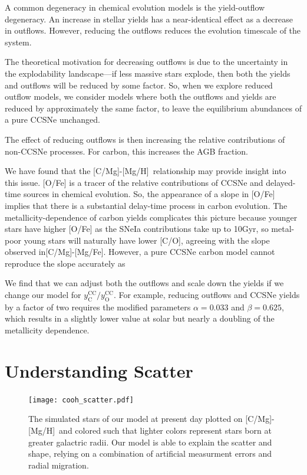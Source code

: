 \documentclass[12pt,oneside]{report}
\newcommand{\caah}{[C/Mg]-[Mg/H]}
\newcommand{\caafe}{[C/Mg]-[Mg/Fe]}
\begin{document}
A common degeneracy in chemical evolution models is the yield-outflow degeneracy. An increase in stellar yields has a near-identical effect as a decrease in outflows. However, reducing the outflows reduces the evolution timescale of the system. 

The theoretical motivation for decreasing outflows is due to the uncertainty in the explodability landscape---if less massive stars explode, then both the yields and outflows will be reduced by some factor. So, when we explore reduced outflow models, we consider models where both the outflows and yields are reduced by approximately the same factor, to leave the equilibrium abundances of a pure CCSNe unchanged. 

The effect of reducing outflows is then increasing the relative contributions of non-CCSNe processes. For carbon, this increases the AGB fraction.

We have found that the \caah~relationship may provide insight into this issue. [O/Fe] is a tracer of the relative contributions of CCSNe and delayed-time sources in chemical evolution. So, the appearance of a slope in [O/Fe] implies that there is a substantial delay-time process in carbon evolution. 
The metallicity-dependence of carbon yields complicates this picture because
younger stars have higher [O/Fe] as the SNeIa contributions take up to 10Gyr,
so metal-poor young stars will naturally have lower [C/O], agreeing with the
slope observed in\caafe. However, a pure CCSNe carbon model cannot reproduce the slope accurately as  


We find that we can adjust both the outflows and scale down the yields if we change our model for $y_\text{C}^\text{CC}/y_\text{O}^\text{CC}$. For example, reducing outflows and CCSNe yields by a factor of two requires the modified parameters
$\alpha = 0.033$ and $\beta = 0.625$, which results in a slightly lower value at solar but nearly a doubling of the metallicity dependence.

\section{Understanding Scatter}

\begin{figure}
    \centering
    \texttt{[image: cooh\_scatter.pdf]}
    \caption[Scatter agreement]{The simulated stars of our model at present day plotted on \caah~and colored such that lighter colors represent stars born at greater galactric radii. Our model is able to explain the scatter and shape, relying on a combination of artificial measurment errors and radial migration.}
\end{figure}
\end{document}
